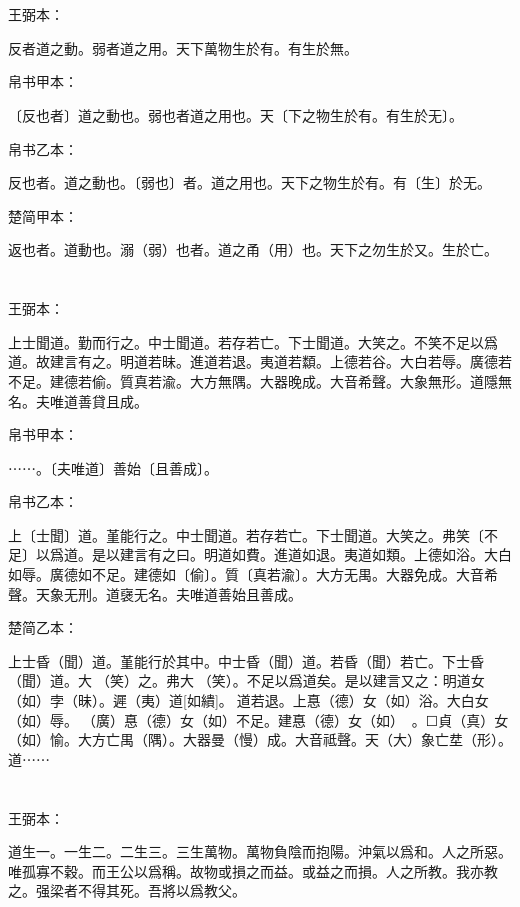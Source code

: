 \documentclass[a5paper]{ctexbook}
\begin{document}
    \chapter{}
    王弼本：

    反者道之動。弱者道之用。天下萬物生於有。有生於無。

    
    帛书甲本：

    〔反也者〕道之動也。弱也者道之用也。天〔下之物生於有。有生於无〕。

    帛书乙本：

    反也者。道之動也。〔弱也〕者。道之用也。天下之物生於有。有〔生〕於无。

    楚简甲本：

    返也者。道動也。溺（弱）也者。道之甬（用）也。天下之勿生於又。生於亡。

    \chapter{}
    王弼本：

    上士聞道。勤而行之。中士聞道。若存若亡。下士聞道。大笑之。不笑不足以爲道。故建言有之。明道若昧。進道若退。夷道若纇。上德若谷。大白若辱。廣德若不足。建德若偷。質真若渝。大方無隅。大器晚成。大音希聲。大象無形。道隱無名。夫唯道善貸且成。

    
    帛书甲本：

    ⋯⋯。〔夫唯道〕善始〔且善成〕。

    帛书乙本：

    上〔士聞〕道。堇能行之。中士聞道。若存若亡。下士聞道。大笑之。弗笑〔不足〕以爲道。是以建言有之曰。明道如費。進道如退。夷道如類。上德如浴。大白如辱。廣德如不足。建德如〔偷〕。質〔真若渝〕。大方无禺。大器免成。大音希聲。天象无刑。道襃无名。夫唯道善始且善成。

    楚简乙本：

    上士昏（聞）道。堇能行於其中。中士昏（聞）道。若昏（聞）若亡。下士昏（聞）道。大𦬫（笑）之。弗大𦬫（笑）。不足以爲道矣。是以建言又之：明道女（如）孛（昧）。遲（夷）道[如繢]。☐道若退。上惪（德）女（如）浴。大白女（如）辱。󼧊（廣）惪（德）女（如）不足。建惪（德）女（如）󲳴☐。☐貞（真）女（如）愉。大方亡禺（隅）。大器曼（慢）成。大音祗聲。天（大）象亡坓（形）。道⋯⋯

    \chapter{}
    王弼本：

    道生一。一生二。二生三。三生萬物。萬物負陰而抱陽。沖氣以爲和。人之所惡。唯孤寡不穀。而王公以爲稱。故物或損之而益。或益之而損。人之所教。我亦教之。强梁者不得其死。吾將以爲教父。
\end{document}
